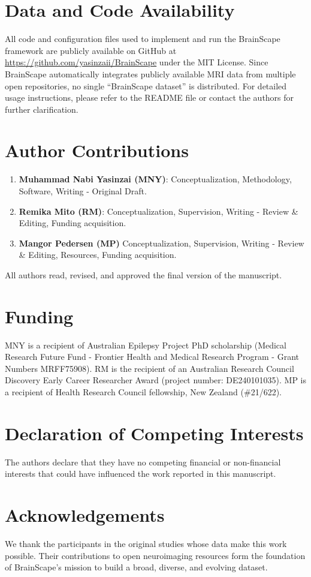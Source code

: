 \section*{Data and Code Availability}

All code and configuration files used to implement and run the BrainScape framework 
are publicly available on GitHub at 
\url{https://github.com/yasinzaii/BrainScape} under the MIT License. 
Since BrainScape automatically integrates publicly available MRI data from multiple open repositories, 
no single ``BrainScape dataset'' is distributed. 
For detailed usage instructions, please refer to the README file or contact the authors for further clarification.


\section*{Author Contributions}

\begin{enumerate}
    \item \textbf{Muhammad Nabi Yasinzai (MNY)}: Conceptualization, Methodology, Software, Writing - Original Draft.
    \item \textbf{Remika Mito (RM)}: Conceptualization, Supervision, Writing - Review \& Editing, Funding acquisition. 
    \item \textbf{Mangor Pedersen (MP)} Conceptualization, Supervision, Writing - Review \& Editing, Resources, Funding acquisition. 
\end{enumerate}
All authors read, revised, and approved the final version of the manuscript.


\section*{Funding}

MNY is a recipient of Australian Epilepsy Project PhD scholarship 
(Medical Research Future Fund - Frontier Health and Medical Research Program - 
Grant Numbers MRFF75908). 
RM is the recipient of an Australian Research Council Discovery Early Career 
Researcher Award (project number: DE240101035). 
MP is a recipient of Health Research Council fellowship, New Zealand (\#21/622).

\section*{Declaration of Competing Interests}

The authors declare that they have no competing financial or non-financial interests 
that could have influenced the work reported in this manuscript.

\section*{Acknowledgements}

We thank the participants in the original studies whose data make this work possible. 
Their contributions to open neuroimaging resources form the foundation of BrainScape's 
mission to build a broad, diverse, and evolving dataset.
